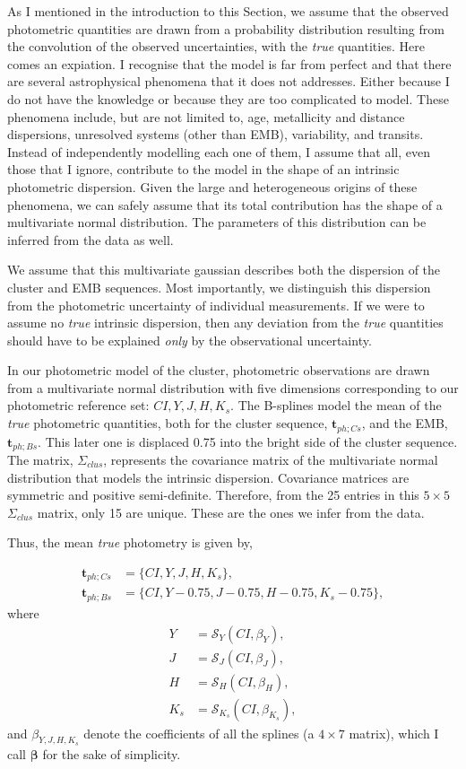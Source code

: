 As I mentioned in the introduction to this Section, we assume that the observed photometric quantities are drawn from a probability distribution resulting from the convolution of the observed uncertainties, with the \emph{true} quantities. Here comes an expiation. I recognise that the model is far from perfect and that there are several astrophysical phenomena that it does not addresses. Either because I do not have the knowledge or because they are too complicated to model. These phenomena include, but are not limited to, age, metallicity and distance dispersions, unresolved systems (other than EMB), variability, and transits. Instead of independently modelling each one of them, I assume that all, even those that I ignore, contribute to the model in the shape of an intrinsic photometric dispersion. Given the large and heterogeneous origins of these phenomena, we can safely assume that its total contribution has the shape of a multivariate normal distribution. The parameters of this distribution can be inferred from the data as well.

We assume that this multivariate gaussian describes both the dispersion of the cluster and EMB sequences. Most importantly, we distinguish this dispersion from the photometric uncertainty of individual measurements. If we were to assume no \emph{true} intrinsic dispersion, then any deviation from the \emph{true} quantities should have to be explained \emph{only} by the observational uncertainty. 

In our photometric model of the cluster, photometric observations are drawn from a multivariate normal distribution with five dimensions corresponding to our photometric reference set: $CI,Y,J,H,K_s$. The B-splines model the mean of the \emph{true} photometric quantities, both for the cluster sequence, $\boldsymbol{t}_{ph;Cs}$, and the EMB, $\boldsymbol{t}_{ph;Bs}$. This later one is displaced 0.75 into the bright side of the cluster sequence. The matrix, $\Sigma_{clus}$, represents the covariance matrix of the multivariate normal distribution that models the intrinsic dispersion. Covariance matrices are symmetric and positive semi-definite. Therefore, from the 25 entries in this $5\times 5$ $\Sigma_{clus}$ matrix, only 15 are unique. These are the ones we infer from the data.

Thus, the mean \emph{true} photometry is given by,

\begin{align}
\boldsymbol{t}_{ph;Cs}&= \{CI,Y,J,H,K_s\},\nonumber \\
\boldsymbol{t}_{ph;Bs}&=\{CI,Y-0.75,J-0.75,H-0.75,K_s-0.75\}, \nonumber
\end{align}
where
\begin{align}
Y &=\mathcal{S}_Y(CI,\beta_Y), \nonumber \\
J &=\mathcal{S}_J(CI,\beta_J),\nonumber \\
 H &=\mathcal{S}_H(CI,\beta_H), \nonumber \\
 K_s &=\mathcal{S}_{K_s}(CI,\beta_{K_s}),  \nonumber 
\end{align}
and $\beta_{Y,J,H,K_s}$ denote the coefficients of all the splines (a $4\times7$ matrix), which  I call $\boldsymbol{\beta}$ for the sake of simplicity.

